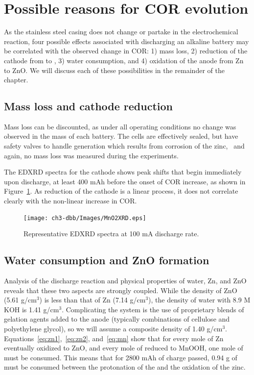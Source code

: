 {\section{Possible reasons for COR evolution}

As the stainless steel casing does not change or partake in the electrochemical reaction, four possible effects associated with discharging an alkaline battery may be correlated with the observed change in COR: 1) mass loss, 2) reduction of the cathode from {} to {}, 3) water consumption, and 4) oxidation of the anode from Zn to ZnO. We will discuss each of these possibilities in the remainder of the chapter. 

\subsection{Mass loss and cathode reduction}

Mass loss can be discounted, as under all operating conditions no change was observed in the mass of each battery. The cells are effectively sealed, but have safety valves to handle  generation which results from corrosion of the zinc,~\cite{linden} and again, no mass loss was measured during the experiments. 

The EDXRD spectra for the {} cathode shows peak shifts that begin immediately upon discharge, at least 400 mAh before the onset of COR increase, as shown in Figure~\ref{fig:mno2}. As reduction of the cathode is a linear process, it does not correlate clearly with the non-linear increase in COR.

\begin{figure}[htb]
\centering
    \texttt{[image: ch3-dbb/Images/MnO2XRD.eps]}
    \caption[Representative  EDXRD spectra at 100 mA discharge rate.]{Representative  EDXRD spectra at 100 mA discharge rate.}
    \label{fig:mno2}
\end{figure}

\subsection{Water consumption and ZnO formation}

Analysis of the discharge reaction and physical properties of water, Zn, and ZnO reveals that these two aspects are strongly coupled.  While the density of ZnO (5.61 g/cm\(^3\)) is less than that of Zn (7.14 g/cm\(^3\)), the density of water with 8.9 M KOH is 1.41 g/cm\(^3.\)  Complicating the system is the use of proprietary blends of gelation agents added to the anode (typically combinations of cellulose and polyethylene glycol), so we will assume a composite density of 1.40 g/cm\(^3.\)~\cite{linden}  Equations~\ref{eq:zn1},~\ref{eq:zn2}, and~\ref{eq:mn} show that for every mole of Zn eventually oxidized to ZnO, and every mole of {} reduced to MnOOH, one mole of  must be consumed.  This means that for 2800 mAh of charge passed, 0.94 g of  must be consumed between the protonation of the {} and the oxidation of the zinc. 

}
